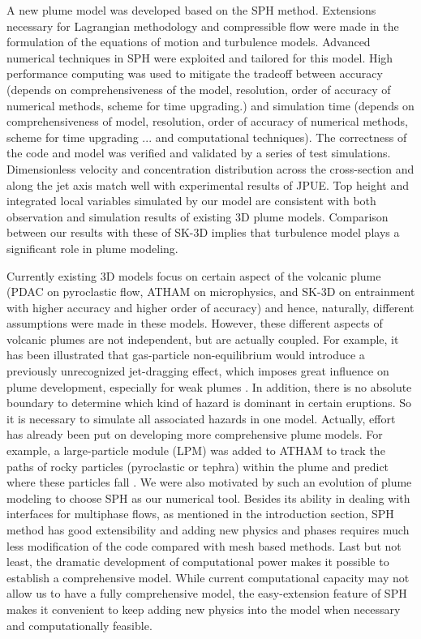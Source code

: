 \documentclass[journal abbreviation, manuscript]{copernicus}
\begin{document}
\conclusions  \label{sec:conclusion}%
A new plume model was developed based on the SPH method. Extensions necessary for Lagrangian methodology and compressible flow were made in the formulation of the equations of motion and turbulence models. Advanced numerical techniques in SPH were exploited and tailored for this model. High performance computing was used to mitigate the tradeoff between accuracy (depends on comprehensiveness of the model, resolution, order of accuracy of numerical methods, scheme for time upgrading.) and simulation time (depends on comprehensiveness of model, resolution, order of accuracy of numerical methods, scheme for time upgrading ... and computational techniques). The correctness of the code and model was verified and validated by a series of test simulations. Dimensionless velocity and concentration distribution across the cross-section and along the jet axis match well with experimental results of JPUE. Top height and integrated local variables simulated by our model are consistent with both observation and simulation results of existing 3D plume models. Comparison between our results with these of SK-3D implies that turbulence model plays a significant role in plume modeling.

Currently existing 3D models focus on certain aspect of the volcanic plume (PDAC on pyroclastic flow, ATHAM on microphysics, and SK-3D on entrainment with higher accuracy and higher order of accuracy) and hence, naturally, different assumptions were made in these models. However, these different aspects of volcanic plumes are not independent, but are actually coupled. For example, it has been illustrated that gas-particle non-equilibrium would introduce a previously unrecognized jet-dragging effect, which imposes great influence on plume development, especially for weak plumes \cite{cerminara2016large}. In addition, there is no absolute boundary to determine which kind of hazard is dominant in certain eruptions. So it is necessary to simulate all associated hazards in one model. Actually, effort has already been put on developing more comprehensive plume models. For example, a large-particle module (LPM) was added to ATHAM to track the paths of rocky particles (pyroclastic or tephra) within the plume and predict where these particles fall \citep{kobs2009modeling}. We were also motivated by such an evolution of plume modeling to choose SPH as our numerical tool. Besides its ability in dealing with interfaces for multiphase flows, as mentioned in the introduction section, SPH method has good extensibility and adding new physics and phases requires much less modification of the code compared with mesh based methods. Last but not least, the dramatic development of computational power makes it possible to establish a comprehensive model. While current computational capacity may not allow us to have a fully comprehensive model, the easy-extension feature of SPH makes it convenient to keep adding new physics into the model when necessary and computationally feasible. 
\end{document}
